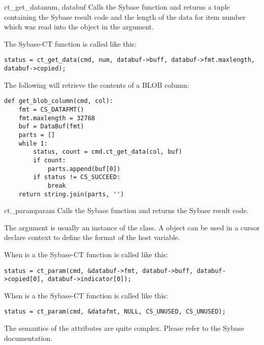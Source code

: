 \begin{methoddesc}[CS_COMMAND]{ct_get_data}{num, databuf}
Calls the Sybase  function and returns a tuple
containing the Sybase result code and the length of the data for item
number  which was read into the  object in the
 argument.

The Sybase-CT  function is called like this:

\begin{verbatim}
status = ct_get_data(cmd, num, databuf->buff, databuf->fmt.maxlength, databuf->copied);
\end{verbatim}

The following will retrieve the contents of a BLOB column:

\begin{verbatim}
def get_blob_column(cmd, col):
    fmt = CS_DATAFMT()
    fmt.maxlength = 32768
    buf = DataBuf(fmt)
    parts = []
    while 1:
        status, count = cmd.ct_get_data(col, buf)
        if count:
            parts.append(buf[0])
        if status != CS_SUCCEED:
            break
    return string.join(parts, '')
\end{verbatim}
\end{methoddesc}

\begin{methoddesc}[CS_COMMAND]{ct_param}{param}
Calls the Sybase  function and returns the Sybase
result code.

The  argument is usually an instance of the 
class.  A  object can be used in a cursor declare
context to define the format of the host variable.

When  is a  the Sybase-CT
 function is called like this:

\begin{verbatim}
status = ct_param(cmd, &databuf->fmt, databuf->buff, databuf->copied[0], databuf->indicator[0]);
\end{verbatim}

When  is a  the Sybase-CT
 function is called like this:

\begin{verbatim}
status = ct_param(cmd, &datafmt, NULL, CS_UNUSED, CS_UNUSED);
\end{verbatim}

The semantics of the  attributes are quite complex.
Please refer to the Sybase documentation.
\end{methoddesc}

